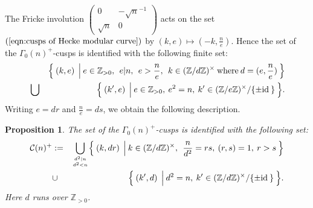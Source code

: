 \documentclass{article}
\theoremstyle{plain}
\newtheorem{proposition}[theorem]{Proposition}%
\theoremstyle{definition}
\theoremstyle{remark}
\newcommand{\Z}{{\mathbb Z}}
\begin{document}
The Fricke involution 
$(
\begin{smallmatrix}
0            &  -\sqrt{n}^{-1} \\
\sqrt{n}     &   0 
\end{smallmatrix}
)$
acts on the set $(\ref{eqn:cusps of Hecke modular curve})$
by 
$(k, e) \mapsto (-k, \frac{n}{e})$.   
Hence the set of the 
$\Gamma _{0}(n)^{+}$-cusps 
is identified with the following finite set: 
\begin{eqnarray*}\label{eqn:cusps of Fricke curve pre}
&   & 
         \Bigl\{ \Bigl. \:
                 (k, e) \: \: \Bigr| \: 
                                e \in {\Z}_{>0}, \: \: e|n, \: \: e>\frac{n}{e}, \: \: 
                                k \in ({\Z}/d{\Z})^{\times} \: {\rm where\/} \: d=(e, \frac{n}{e}) \: 
          \Bigr\} \\
& \bigcup &  
         \Bigl\{ \Bigl. \: 
                 (k', e) \: \: \Bigr| \: 
                                e \in {\Z}_{>0}, \: e^{2}=n, \:  
                                k' \in ({\Z}/e{\Z})^{\times}/ \{  \pm {\rm id\/} \: \} \:  
          \Bigr\} . 
\end{eqnarray*}
Writing $e=dr$ and $\frac{n}{e} = ds$, 
we obtain the following description. 










\begin{proposition}\label{prop:cusps of Fricke modular curve} 
The set of the 
$\Gamma _{0}(n)^{+}$-cusps 
is identified with the following set:  
\begin{eqnarray}\label{eqn:cusps of Fricke curve final}
\mathcal{C}(n)^{+}    & :=  &   \bigcup_{{d^{2}|n}\atop{d^{2}<n}} 
                \Bigl\{ \Bigl. \:
                         (k, dr) \: \: \Bigr| \: 
                                       k \in ({\Z}/d{\Z})^{\times}, \: \: 
                                       \frac{n}{d^{2}}=rs, \: (r, s)=1,\:  r>s \:  
                \Bigr\} \nonumber\\
                 & \cup &   
                   \Bigl\{ \Bigl. \: 
                              (k', d) \: \: \Bigr| \: 
                                     d^{2}=n, \:  k' \in ({\Z}/d{\Z})^{\times}/ \{  \pm {\rm id\/} \: \} \:  
                   \Bigr\} . 
\end{eqnarray} 
Here $d$ runs over ${\Z}_{>0}$. 
\end{proposition}
\end{document}

